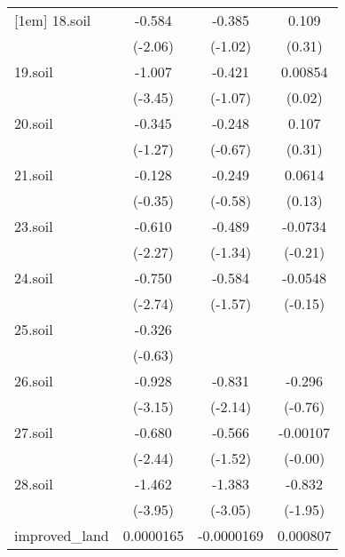 {\begin{tabular}{l*{3}{c}}
[1em]
18.soil     &      -0.584\sym{**} &      -0.385         &       0.109         \\
            &     (-2.06)         &     (-1.02)         &      (0.31)         \\
[1em]
19.soil     &      -1.007\sym{***}&      -0.421         &     0.00854         \\
            &     (-3.45)         &     (-1.07)         &      (0.02)         \\
[1em]
20.soil     &      -0.345         &      -0.248         &       0.107         \\
            &     (-1.27)         &     (-0.67)         &      (0.31)         \\
[1em]
21.soil     &      -0.128         &      -0.249         &      0.0614         \\
            &     (-0.35)         &     (-0.58)         &      (0.13)         \\
[1em]
23.soil     &      -0.610\sym{**} &      -0.489         &     -0.0734         \\
            &     (-2.27)         &     (-1.34)         &     (-0.21)         \\
[1em]
24.soil     &      -0.750\sym{***}&      -0.584         &     -0.0548         \\
            &     (-2.74)         &     (-1.57)         &     (-0.15)         \\
[1em]
25.soil     &      -0.326         &                     &                     \\
            &     (-0.63)         &                     &                     \\
[1em]
26.soil     &      -0.928\sym{***}&      -0.831\sym{**} &      -0.296         \\
            &     (-3.15)         &     (-2.14)         &     (-0.76)         \\
[1em]
27.soil     &      -0.680\sym{**} &      -0.566         &    -0.00107         \\
            &     (-2.44)         &     (-1.52)         &     (-0.00)         \\
[1em]
28.soil     &      -1.462\sym{***}&      -1.383\sym{***}&      -0.832\sym{*}  \\
            &     (-3.95)         &     (-3.05)         &     (-1.95)         \\
[1em]
improved\_land&   0.0000165         &  -0.0000169         &    0.000807\sym{***}\\

\end{tabular}}
